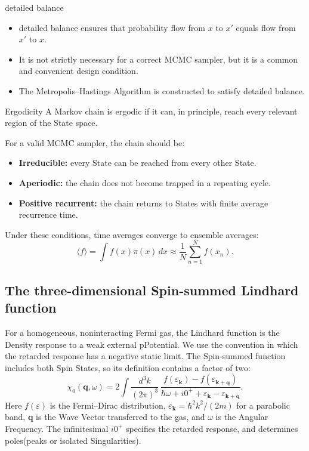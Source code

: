 \documentclass[a4paper, 10pt, onepage]{elegantbook}
\begin{document}
{\begin{frame}{detailed balance}
  \begin{itemize}
    \item detailed balance ensures that probability flow from \(x\) to \(x'\) equals flow from \(x'\) to \(x\).
    \item It is not strictly necessary for a correct MCMC sampler, but it is a common and convenient design condition.
    \item The Metropolis--Hastings Algorithm is constructed to satisfy detailed balance.
  \end{itemize}
\end{frame}

\begin{frame}{Ergodicity}
  A Markov chain is ergodic if it can, in principle, reach every relevant region of the State space.

  For a valid MCMC sampler, the chain should be:
  \begin{itemize}
    \item \textbf{Irreducible:} every State can be reached from every other State.
    \item \textbf{Aperiodic:} the chain does not become trapped in a repeating cycle.
    \item \textbf{Positive recurrent:} the chain returns to States with finite average recurrence time.
  \end{itemize}

  Under these conditions, time averages converge to ensemble averages:
  \[
    \langle f\rangle
    =
    \int f(x)\pi(x)\,dx
    \approx
    \frac{1}{N}
    \sum_{n=1}^{N}f(x_n).
  \]
\end{frame}

\subsection{The three-dimensional Spin-summed Lindhard function}

For a homogeneous, noninteracting Fermi gas, the Lindhard function is the
Density response to a weak external pPotential. We use the convention in
which the retarded response has a negative static limit. The Spin-summed
function includes both Spin States, so its definition contains a factor of
two:
\begin{equation}
\chi_0(\mathbf q,\omega)
=
2\int\frac{d^3k}{(2\pi)^3}\,
\frac{
f(\varepsilon_{\mathbf k})-
f(\varepsilon_{\mathbf{k+q}})
}{
\hbar\omega+i0^+
+\varepsilon_{\mathbf k}-\varepsilon_{\mathbf{k+q}}
}.
\label{eq:lindhard-general}
\end{equation}
Here \(f(\varepsilon)\) is the Fermi--Dirac distribution,
\(\varepsilon_{\mathbf k}=\hbar^2 k^2/(2m)\) for a parabolic band,
\(\mathbf q\) is the Wave Vector transferred to the gas, and \(\omega\)
is the Angular Frequency. The infinitesimal \(i0^+\) specifies the
retarded response, and determines poles(peaks or isolated Singularities).

}
\end{document}
